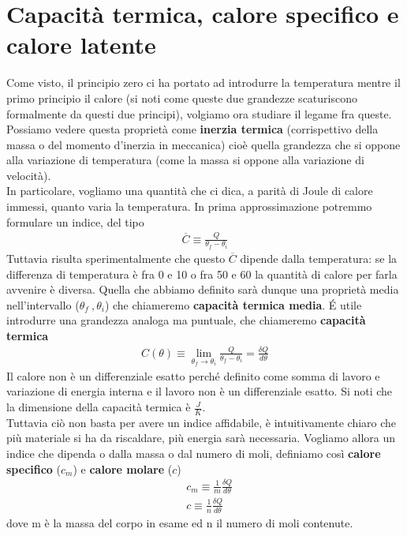 \documentclass[10pt,a4paper]{article}
\begin{document}
\section{Capacità termica, calore specifico e calore latente}
Come visto, il principio zero ci ha portato ad introdurre la temperatura mentre il primo principio il calore (si noti come queste due grandezze scaturiscono formalmente da questi due principi), volgiamo ora studiare il legame fra queste. Possiamo vedere questa proprietà come \textbf{inerzia termica} (corrispettivo della massa o del momento d'inerzia in meccanica) cioè quella grandezza che si oppone alla variazione di temperatura (come la massa si oppone alla variazione di velocità).  \\
In particolare, vogliamo una quantità che ci dica, a parità di Joule di calore immessi, quanto varia la temperatura. In prima approssimazione potremmo formulare un indice, del tipo
\begin{align*} 
	\overline{C} \equiv \frac{Q}{\theta_f - \theta_i}
\end{align*} 
Tuttavia risulta sperimentalmente che questo $\overline{C}$ dipende dalla temperatura: se la differenza di temperatura è fra 0 e 10 o fra 50 e 60 la quantità di calore per farla avvenire è diversa. Quella che abbiamo definito sarà dunque una proprietà media nell'intervallo ($\theta_f\ , \theta_i$) che chiameremo \textbf{capacità termica media}. \'{E} utile introdurre una grandezza analoga ma puntuale, che chiameremo \textbf{capacità termica}
\begin{align*} 
	C(\theta) \equiv \lim_{\theta_f \to \theta_i} \frac{Q}{\theta_f - \theta_i} = \frac{\delta Q}{d \theta}
\end{align*} 
Il calore non è un differenziale esatto perché definito come somma di lavoro e variazione di energia interna e il lavoro non è un differenziale esatto. Si noti che la dimensione della capacità termica è $\frac{J}{K}$.\\
Tuttavia ciò non basta per avere un indice affidabile, è intuitivamente chiaro che più materiale si ha da riscaldare, più energia sarà necessaria. Vogliamo allora un indice che dipenda o dalla massa o dal numero di moli, definiamo così \textbf{calore specifico} ($c_m$) e \textbf{calore molare} ($c$)
\begin{align*} 
&c_m \equiv \frac{1}{m} \frac{\delta Q}{d\theta}\\
&c \equiv \frac{1}{n} \frac{\delta Q}{d\theta}
\end{align*} 
dove m è la massa del corpo in esame ed n il numero di moli contenute.\\
\end{document}
